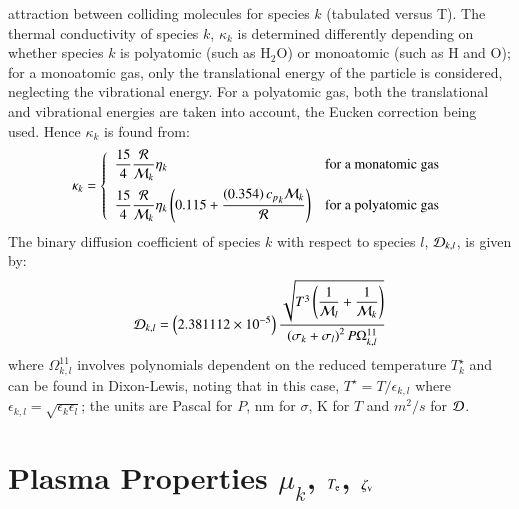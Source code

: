 \documentclass{warpdoc}
\newcommand{\cp}{{c_p}}
\newcommand{\mfd}{\displaystyle}
\begin{document}
attraction between colliding molecules for species $k$ (tabulated
versus T). The thermal conductivity of species $k$, $\kappa_k$ is determined
differently depending on whether
species $k$ is polyatomic (such as H$_2$O) or monoatomic
(such as H and O); for a monoatomic gas, only the
translational energy of the particle is considered,
neglecting the vibrational energy. For a polyatomic gas,
both the translational and vibrational energies are taken into
account, the Eucken correction being used. Hence $\kappa_k$
is found from:
%
\begin{equation}
\kappa_k = \left\{ \begin{array}{ll}
\vspace{0.2cm}
\mfd\frac{15}{4} \mfd\frac{\cal R}{{\cal M}_k} \eta_k & {\rm for~a~monatomic~gas} \\
\mfd\frac{15}{4} \mfd\frac{\cal R}{{\cal M}_k} \eta_k \left(  0.115 +
   \mfd\frac{ \left( 0.354 \right) {\cp}_k{\cal M}_k}{\cal R}  \right)
        & {\rm for~a~polyatomic~gas} \\
\end{array}
\right.
\label{eqn:moltherm-kappa}
\end{equation}
%
The binary diffusion coefficient of species $k$ with respect to species $l$,
${\cal D}_{k,l}$, is given by:
%
\begin{equation}
{\cal D}_{k,l}=\left( 2.381112 \times 10^{-5} \right) \frac{\sqrt{T^3 \mfd  \left(\frac{1}{{\cal M}_l} + \frac{1}{{\cal M}_k} \right)}}
              {  \left( \sigma_k + \sigma_l \right)^2 P \Omega^{11}_{k,l}}
\label{eqn:moldiff-binary}
\end{equation}
%
where $\Omega^{11}_{k,l}$ involves
polynomials dependent on the reduced temperature $T^\star_k$
and can be found in Dixon-Lewis, noting that in this case, $T^\star=T/\epsilon_{k,l}$
where $\epsilon_{k,l}=\sqrt{\epsilon_k \epsilon_l}$; the units are Pascal for $P$, nm for $\sigma$,
K for $T$ and $m^2/s$ for $\cal D$.



\section{Plasma Properties $\mu_k$, $T_{\rm e}$, $\zeta_{\rm v}$}
\end{document}
